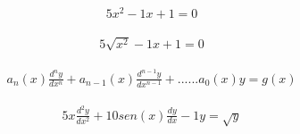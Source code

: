 \documentclass{article}
\begin{document}
\begin{gather*}
5x^{2}-1x+1=0
\end{gather*}
   
\begin{gather*}
5\sqrt{x^{2}}-1x+1=0
\end{gather*}





\begin{gather*}
a_{n}(x)\frac{d^{n}y}{dx^{n}}+a_{n-1}(x)\frac{d^{n-1}y}{dx^{n-1}}+......a_{0}(x)y = g(x)
\end{gather*}



\begin{gather*}
5x\frac{d^{2}y}{dx^{2}}+10sen(x)\frac{dy}{dx} -1 y = \sqrt{y}
\end{gather*}
\end{document}
